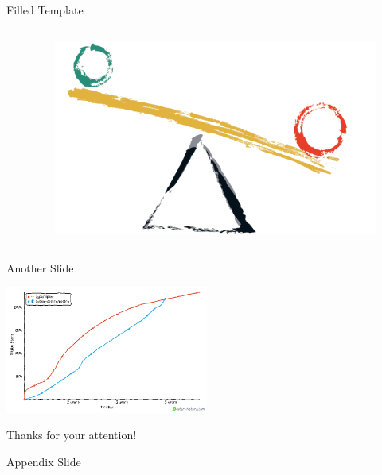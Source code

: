 \documentclass[9pt]{beamer}
\begin{document}
\begin{frame}{Filled Template}
    \begin{columns}
        \begin{column}{0.5\textwidth}
            \lipsum[1]
        \end{column}
        \begin{column}{0.5\textwidth}
            \lipsum[1][1-2]

            \begin{figure}
                \centering
                \begin{tcolorbox}[width=0.5\textwidth,size=tight,sharpish corners,boxrule=0mm]
                    \includegraphics[width=\textwidth]{balancing}
                \end{tcolorbox}
            \end{figure}

            \lipsum[1][3-4]
        \end{column}
    \end{columns}
\end{frame}

\begin{frame}{Another Slide}
    \begin{tcolorbox}[size=tight,sharpish corners,boxrule=0mm]
        \includegraphics[width=0.5\textwidth]{poetry-vs-pipenv}
    \end{tcolorbox}
\end{frame}

\begin{frame}[standout]
    Thanks for your attention!
\end{frame}

\appendix

\begin{frame}{Appendix Slide}
\end{frame}
\end{document}
